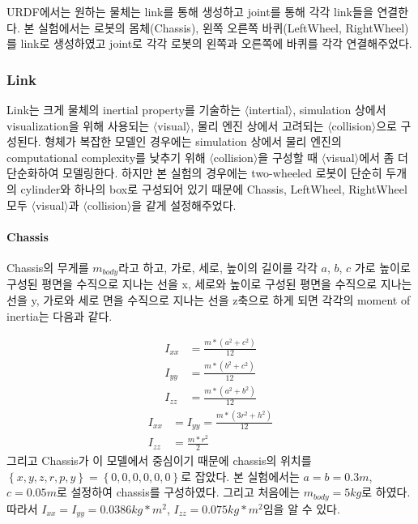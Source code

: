 \documentclass{article}
\begin{document}
URDF에서는 원하는 물체는 link를 통해 생성하고 joint를 통해 각각 link들을 연결한다. 본 실험에서는 로봇의 몸체(Chassis), 왼쪽 오른쪽 바퀴(LeftWheel, RightWheel)를 link로 생성하였고 joint로 각각 로봇의 왼쪽과 오른쪽에 바퀴를 각각 연결해주었다.   

\subsubsection{Link}

Link는 크게 물체의 inertial property를 기술하는 $\langle$intertial$\rangle$, simulation 상에서 visualization을 위해 사용되는 $\langle$visual$\rangle$, 물리 엔진 상에서 고려되는 $\langle$collision$\rangle$으로 구성된다. 형체가 복잡한 모델인 경우에는 simulation 상에서 물리 엔진의 computational complexity를 낮추기 위해 $\langle$collision$\rangle$을 구성할 때 $\langle$visual$\rangle$에서 좀 더 단순화하여 모델링한다. 하지만 본 실험의 경우에는 two-wheeled 로봇이 단순히 두개의 cylinder와 하나의 box로 구성되어 있기 때문에 Chassis, LeftWheel, RightWheel 모두 $\langle$visual$\rangle$과 $\langle$collision$\rangle$을 같게 설정해주었다.

\paragraph{Chassis}

Chassis의 무게를 $m_{body}$라고 하고, 가로, 세로, 높이의 길이를 각각 $a$, $b$, $c$ 가로 높이로 구성된 평면을 수직으로 지나는 선을 x, 세로와 높이로 구성된 평면을 수직으로 지나는 선을 y, 가로와 세로 면을 수직으로 지나는 선을 z축으로 하게 되면 각각의 moment of inertia는 다음과 같다. 

\begin{align}
I_{xx} & =\frac{m*(a^2 + c^2)}{12} \\ 
I_{yy} & =\frac{m*(b^2 + c^2)}{12} \\
I_{zz} & =\frac{m*(a^2 + b^2)}{12} 
\end{align}
\begin{align}
I_{xx} & = I_{yy} = \frac{m*(3r^2 + h^2)}{12} \\ 
I_{zz} & =\frac{m*r^2}{2} 
\end{align}
그리고 Chassis가 이 모델에서 중심이기 때문에 chassis의 위치를 $\left\{x, y, z, r, p, y\right\}=\left\{0, 0, 0, 0, 0, 0\right\}$로 잡았다. 본 실험에서는 $a=b=0.3m$, $c=0.05m$로 설정하여 chassis를 구성하였다. 그리고 처음에는 $m_{body}=5kg$로 하였다. 따라서 $I_{xx}=I_{yy}=0.0386kg*m^{2}$,  $I_{zz}=0.075kg*m^{2}$임을 알 수 있다.
\end{document}
